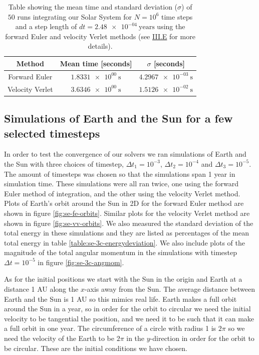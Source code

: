 \documentclass[reprint,english,notitlepage]{revtex4-1}  %
\begin{document}
\begin{table}[H]
\caption{Table showing the mean time and standard deviation ($\sigma$) of \(50\) runs integrating our Solar System for \(N = 10^6\) time steps and a step length of \(dt = \SI{2.48e-04}{\text{years}}\) using the forward Euler and velocity Verlet methods (see \hyperref[sec:III:e]{III.E} for more details).}
\begin{tabular}{|c|c|c|}
\hline
Method & Mean time [seconds] & $\sigma$ [seconds] \\
\hline
Forward Euler & \(\SI{1.8331e+00}{\second}\) & \(\SI{4.2967e-03}{\second}\) \\
Velocity Verlet &  \(\SI{3.6346e+00}{\second}\) & \(\SI{1.5126e-02}{\second}\)\\
\hline
\end{tabular}
\label{table:benchmark}
\end{table}

\subsection{Simulations of Earth and the Sun for a few selected timesteps} \label{sec:IV:b}

In order to test the convergence of our solvers we ran simulations of Earth and the Sun with three choices of timestep, $\Delta t_1 = 10^{-3}$, $\Delta t_2 = 10^{-4}$ and $\Delta t_3 = 10^{-5}$. The amount of timesteps was chosen so that the simulations span 1 year in simulation time. These simulations were all ran twice, one using the forward Euler method of integration, and the other using the velocity Verlet method. Plots of Earth's orbit around the Sun in 2D for the forward Euler method are shown in figure \ref{fig:se-fe-orbits}. Similar plots for the velocity Verlet method are shown in figure \ref{fig:se-vv-orbits}. We also measured the standard deviation of the total energy in these simulations and they are listed as percentages of the mean total energy in table \ref{table:se-3c-energydeviation}. We also include plots of the magnitude of the total angular momentum in the simulations with timestep $\Delta t = 10^{-5}$ in figure \ref{fig:se-3c-angmom}.

As for the initial positions we start with the Sun in the origin and Earth at a distance 1 AU along the $x$-axis away from the Sun. The average distance between Earth and the Sun is 1 AU so this mimics real life. Earth makes a full orbit around the Sun in a year, so in order for the orbit to circular we need the initial velocity to be tangential the position, and we need it to be such that it can make a full orbit in one year. The circumference of a circle with radius 1 is $2\pi$ so we need the velocity of the Earth to be $2\pi$ in the $y$-direction in order for the orbit to be circular. These are the initial conditions we have chosen.
\end{document}
